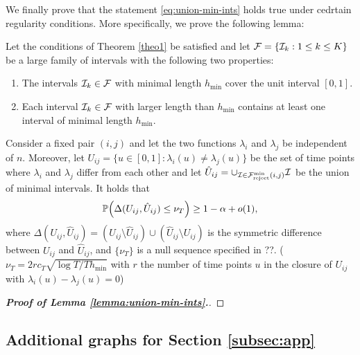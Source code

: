 \documentclass[a4paper,12pt]{article}
\numberwithin{equation}{section}
\begin{document}
{\color{red}
We finally prove that the statement \eqref{eq:union-min-ints} holds true under cedrtain regularity conditions. More specifically, we prove the following lemma:
\begin{lemma}\label{lemma:union-min-ints}
Let the conditions of Theorem \ref{theo1} be satisfied and let $\mathcal{F} = \{\mathcal{I}_k: 1 \le k \le K\}$ be a large family of intervals with the following two properties: 
\begin{enumerate}[label=(\alph*),leftmargin=0.75cm]
\item The intervals $\mathcal{I}_k \in \mathcal{F}$ with minimal length $h_{\min}$ cover the unit interval $[0,1]$.
\item Each interval $\mathcal{I}_k \in \mathcal{F}$ with larger length than $h_{\min}$ contains at least one interval of minimal length $h_{\min}$. 
\end{enumerate}
Consider a fixed pair $(i,j)$ and let the two functions $\lambda_i$ and $\lambda_j$ be independent of $n$. Moreover, let $U_{ij} = \{ u \in [0,1]: \lambda_i(u) \ne \lambda_j(u) \}$ be the set of time points where $\lambda_i$ and $\lambda_j$ differ from each other and let $\hat{U}_{ij} = \cup_{\mathcal{I} \in \mathcal{F}_{\text{reject}}^{\text{min}}(i,j)} \mathcal{I}$ be the union of minimal intervals. It holds that 
\begin{equation*}
\mathbb{P} \Big( \Delta(U_{ij}, \hat{U}_{ij}) \le \nu_T \Big) \ge 1-\alpha + o(1), 
\end{equation*}
where $\Delta(U_{ij},\hat{U}_{ij}) = (U_{ij} \setminus \hat{U}_{ij}) \cup (\hat{U}_{ij} \setminus U_{ij})$ is the symmetric difference between $U_{ij}$ and $\hat{U}_{ij}$, and $\{\nu_T\}$ is a null sequence specified in ??. ($\nu_T = 2 r c_T \sqrt{\log T/Th_{\min}}$ with $r$ the number of time points $u$ in the closure of $U_{ij}$ with $\lambda_i(u) - \lambda_j(u) = 0$) 
\end{lemma}
\begin{proof}[\textnormal{\textbf{Proof of Lemma \ref{lemma:union-min-ints}.}}]
\end{proof}
}



\newpage
\subsection{Additional graphs for Section \ref{subsec:app}}\label{s:subsec:app}
\end{document}
